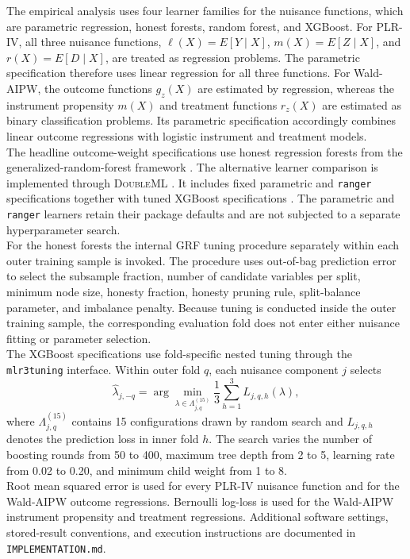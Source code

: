 \documentclass[12pt, a4paper, oneside]{article}
\theoremstyle{plain}
\theoremstyle{definition}
\begin{document}
The empirical analysis uses four learner families for the nuisance functions, which are 
parametric regression, honest forests, random forest, and XGBoost. For
PLR-IV, all three nuisance functions,
$\ell(X)=E[Y\mid X]$, $m(X)=E[Z\mid X]$, and
$r(X)=E[D\mid X]$, are treated as regression problems. The parametric
specification therefore uses linear regression for all three functions.
For Wald-AIPW, the outcome functions $g_z(X)$ are estimated by regression,
whereas the instrument propensity $m(X)$ and treatment functions $r_z(X)$
are estimated as binary classification problems. Its parametric specification
accordingly combines linear outcome regressions with logistic instrument and
treatment models.\\
The headline outcome-weight specifications use honest regression forests from
the generalized-random-forest framework
\citep{athey2019generalized,knaus2024treatment}.
The alternative learner comparison is implemented through
\textsc{DoubleML} \citep{bach2022doubleml}. It includes fixed parametric and
\texttt{ranger} specifications together with tuned XGBoost specifications
\citep{wright2017ranger,chen2016xgboost}.
The parametric and \texttt{ranger} learners retain their package defaults and
are not subjected to a separate hyperparameter search.\\
For the honest forests the internal GRF tuning procedure
separately within each outer training sample is invoked. The procedure uses out-of-bag
prediction error to select the subsample fraction, number of candidate
variables per split, minimum node size, honesty fraction, honesty pruning rule,
split-balance parameter, and imbalance penalty. Because tuning is conducted
inside the outer training sample, the corresponding evaluation fold does not
enter either nuisance fitting or parameter selection.\\
The XGBoost specifications use fold-specific nested tuning through the
\texttt{mlr3tuning} interface. Within outer fold \(q\),
each nuisance component \(j\) selects
\begin{equation}
    \widehat{\lambda}_{j,-q}
    =
    \arg\min_{\lambda\in\Lambda_{j,q}^{(15)}}
    \frac{1}{3}\sum_{h=1}^{3}
    L_{j,q,h}(\lambda),
    \label{eq:nested_tuning}
\end{equation}
where $\Lambda_{j,q}^{(15)}$ contains 15 configurations drawn by random
search and $L_{j,q,h}$ denotes the prediction loss in inner fold \(h\).
The search varies the number of boosting rounds from 50 to 400, maximum tree
depth from 2 to 5, learning rate from 0.02 to 0.20, and minimum child weight
from 1 to 8.\\
Root mean squared error is used for every PLR-IV nuisance function and for the
Wald-AIPW outcome regressions. Bernoulli log-loss is used for the Wald-AIPW
instrument propensity and treatment regressions.  Additional software settings, stored-result conventions,
and execution instructions are documented in
\texttt{IMPLEMENTATION.md}.
\end{document}
